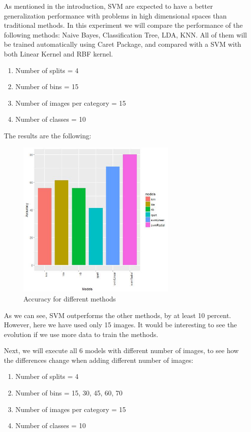 As mentioned in the introduction, SVM are expected to have a better generalization performance with problems in high dimensional spaces than traditional methods. In this experiment we will compare the performance of the following methods: Naive Bayes, Classification Tree, LDA, KNN. All of them will be trained automatically using Caret Package, and compared with a SVM with both Linear Kernel and RBF kernel. 

\begin{enumerate}
    \item Number of splits = 4
    \item Number of bins = 15
    \item Number of images per category = 15
    \item Number of classes = 10
\end{enumerate}

The results are the following:

\begin{figure}[H]
\centering
\includegraphics[width=0.7\textwidth]{Images/Accuracy_for_categories_starfish_minaret_2.jpeg}
\caption{Accuracy for different methods}
\end{figure}

As we can see, SVM outperforms the other methods, by at least 10 percent. However, here we have used only 15 images. It would be interesting to see the evolution if we use more data to train the methods. 

Next, we will execute all 6 models with different number of images, to see how the differences change when adding different number of images:

\begin{enumerate}
    \item Number of splits = 4
    \item Number of bins = 15, 30, 45, 60, 70
    \item Number of images per category = 15
    \item Number of classes = 10
\end{enumerate}

